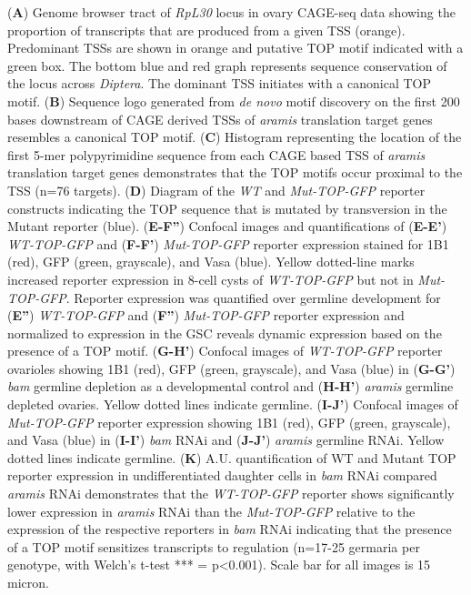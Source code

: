 \documentclass[12pt,oneside]{reedthesis}
\begin{document}
\setlength\parindent{0pt}(\textbf{A}) Genome browser tract of \emph{RpL30} locus in ovary CAGE-seq data showing the proportion of transcripts that are produced from a given TSS (orange). Predominant TSSs are shown in orange and putative TOP motif indicated with a green box. The bottom blue and red graph represents sequence conservation of the locus across \emph{Diptera}. The dominant TSS initiates with a canonical TOP motif. (\textbf{B}) Sequence logo generated from \emph{de novo} motif discovery on the first 200 bases downstream of CAGE derived TSSs of \emph{aramis} translation target genes resembles a canonical TOP motif. (\textbf{C}) Histogram representing the location of the first 5-mer polypyrimidine sequence from each CAGE based TSS of \emph{aramis} translation target genes demonstrates that the TOP motifs occur proximal to the TSS (n=76 targets). (\textbf{D}) Diagram of the \emph{WT} and \emph{Mut-TOP-GFP} reporter constructs indicating the TOP sequence that is mutated by transversion in the Mutant reporter (blue). (\textbf{E-F''}) Confocal images and quantifications of (\textbf{E-E'}) \emph{WT-TOP-GFP} and (\textbf{F-F'}) \emph{Mut-TOP-GFP} reporter expression stained for 1B1 (red), GFP (green, grayscale), and Vasa (blue). Yellow dotted-line marks increased reporter expression in 8-cell cysts of \emph{WT-TOP-GFP} but not in \emph{Mut-TOP-GFP}. Reporter expression was quantified over germline development for (\textbf{E''}) \emph{WT-TOP-GFP} and (\textbf{F''}) \emph{Mut-TOP-GFP} reporter expression and normalized to expression in the GSC reveals dynamic expression based on the presence of a TOP motif. (\textbf{G-H'}) Confocal images of \emph{WT-TOP-GFP} reporter ovarioles showing 1B1 (red), GFP (green, grayscale), and Vasa (blue) in (\textbf{G-G'}) \emph{bam} germline depletion as a developmental control and (\textbf{H-H'}) \emph{aramis} germline depleted ovaries. Yellow dotted lines indicate germline. (\textbf{I-J'}) Confocal images of \emph{Mut-TOP-GFP} reporter expression showing 1B1 (red), GFP (green, grayscale), and Vasa (blue) in (\textbf{I-I'}) \emph{bam} RNAi and (\textbf{J-J'}) \emph{aramis} germline RNAi. Yellow dotted lines indicate germline. (\textbf{K}) A.U. quantification of WT and Mutant TOP reporter expression in undifferentiated daughter cells in \emph{bam} RNAi compared \emph{aramis} RNAi demonstrates that the \emph{WT-TOP-GFP} reporter shows significantly lower expression in \emph{aramis} RNAi than the \emph{Mut-TOP-GFP} relative to the expression of the respective reporters in \emph{bam} RNAi indicating that the presence of a TOP motif sensitizes transcripts to regulation (n=17-25 germaria per genotype, with Welch's t-test *** = p\textless0.001). Scale bar for all images is 15 micron.
\end{document}
